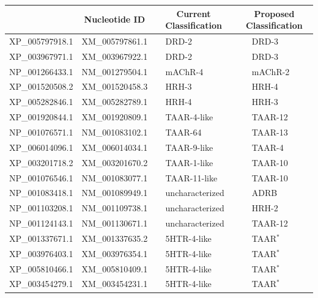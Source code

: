 \documentclass[fleqn,10pt]{wlpeerj}
\begin{document}
\begin{table}[htbp]
	\centering
	\begin{tabular}{l l l l l l}
		\hline\noalign{\smallskip}
		\multicolumn{1}{c}{Protein ID} & \multicolumn{1}{c}{Nucleotide ID} & \multicolumn{2}{c}{Current Classification} & \multicolumn{2}{c}{Proposed Classification} \\
		\hline\noalign{\smallskip}
		XP\_005797918.1 & XM\_005797861.1 & \qquad \qquad & DRD-2 & \qquad \qquad & DRD-3 \\
		XP\_003967971.1 & XM\_003967922.1 & \qquad \qquad & DRD-2 & \qquad \qquad & DRD-3 \\
		NP\_001266433.1 & NM\_001279504.1 & \qquad \qquad & mAChR-4 & \qquad \qquad & mAChR-2 \\
		XP\_001520508.2 & XM\_001520458.3 & \qquad \qquad & HRH-3 & \qquad \qquad & HRH-4 \\
		XP\_005282846.1 & XM\_005282789.1 & \qquad \qquad & HRH-4 & \qquad \qquad & HRH-3 \\
		XP\_001920844.1 & XM\_001920809.1 & \qquad \qquad & TAAR-4-like & \qquad \qquad & TAAR-12 \\
		NP\_001076571.1 & NM\_001083102.1 & \qquad \qquad & TAAR-64 & \qquad \qquad & TAAR-13 \\
		XP\_006014096.1 & XM\_006014034.1 & \qquad \qquad & TAAR-9-like & \qquad \qquad & TAAR-4 \\
		XP\_003201718.2 & XM\_003201670.2 & \qquad \qquad & TAAR-1-like & \qquad \qquad & TAAR-10 \\
		NP\_001076546.1 & NM\_001083077.1 & \qquad \qquad & TAAR-11-like & \qquad \qquad & TAAR-10 \\
		NP\_001083418.1 & NM\_001089949.1 & \qquad \qquad & uncharacterized & \qquad \qquad & ADRB \\
		NP\_001103208.1 & NM\_001109738.1 & \qquad \qquad & uncharacterized & \qquad \qquad & HRH-2 \\
		NP\_001124143.1 & NM\_001130671.1 & \qquad \qquad & uncharacterized & \qquad \qquad & TAAR-12 \\
		XP\_001337671.1 & XM\_001337635.2 & \qquad \qquad & 5HTR-4-like & \qquad \qquad & TAAR$^\ast$ \\
		XP\_003976403.1 & XM\_003976354.1 & \qquad \qquad & 5HTR-4-like & \qquad \qquad & TAAR$^\ast$ \\
		XP\_005810466.1 & XM\_005810409.1 & \qquad \qquad & 5HTR-4-like & \qquad \qquad & TAAR$^\ast$ \\
		XP\_003454279.1 & XM\_003454231.1 & \qquad \qquad & 5HTR-4-like & \qquad \qquad & TAAR$^\ast$ \\

\end{tabular}
\end{table}
\end{document}
